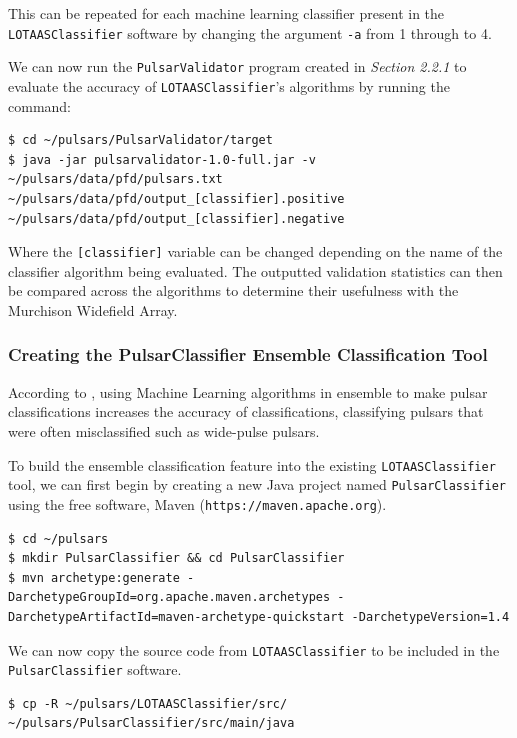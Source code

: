 \documentclass{article}
\begin{document}
This can be repeated for each machine learning classifier present in the \verb|LOTAASClassifier| software by changing the argument \verb|-a| from 1 through to 4.

We can now run the \verb|PulsarValidator| program created in \emph{Section 2.2.1} to evaluate the accuracy of \verb|LOTAASClassifier|'s algorithms by running the command:

\begin{lstlisting}[numbers=none]
$ cd ~/pulsars/PulsarValidator/target
$ java -jar pulsarvalidator-1.0-full.jar -v ~/pulsars/data/pfd/pulsars.txt ~/pulsars/data/pfd/output_[classifier].positive ~/pulsars/data/pfd/output_[classifier].negative
\end{lstlisting}

Where the \verb|[classifier]| variable can be changed depending on the name of the classifier algorithm being evaluated. The outputted validation statistics can then be compared across the algorithms to determine their usefulness with the Murchison Widefield Array.

\subsubsection{Creating the PulsarClassifier Ensemble Classification Tool}
\label{sec:methodensemble}
According to \cite{tan}, using Machine Learning algorithms in ensemble to make pulsar classifications increases the accuracy of classifications, classifying pulsars that were often misclassified such as wide-pulse pulsars.

To build the ensemble classification feature into the existing \verb|LOTAASClassifier| tool, we can first begin by creating a new Java project named \verb|PulsarClassifier| using the free software, Maven (\verb|https://maven.apache.org|).

\begin{lstlisting}[numbers=none]
$ cd ~/pulsars
$ mkdir PulsarClassifier && cd PulsarClassifier
$ mvn archetype:generate -DarchetypeGroupId=org.apache.maven.archetypes -DarchetypeArtifactId=maven-archetype-quickstart -DarchetypeVersion=1.4
\end{lstlisting}

We can now copy the source code from \verb|LOTAASClassifier| to be included in the \verb|PulsarClassifier| software.

\begin{lstlisting}[numbers=none]
$ cp -R ~/pulsars/LOTAASClassifier/src/ ~/pulsars/PulsarClassifier/src/main/java
\end{lstlisting}
\end{document}
